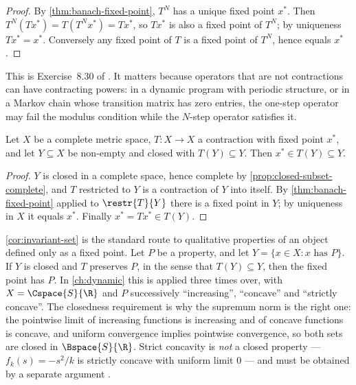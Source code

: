 \begin{proof}
	By \autoref{thm:banach-fixed-point}, $T^N$ has a unique fixed point $x^\ast$.
	Then $T^N(Tx^\ast)=T(T^Nx^\ast)=Tx^\ast$, so $Tx^\ast$ is also a fixed point of
	$T^N$; by uniqueness $Tx^\ast=x^\ast$. Conversely any fixed point of $T$ is a
	fixed point of $T^N$, hence equals $x^\ast$.
\end{proof}

This is Exercise~8.30 of \textcite[p.~290]{fukuda2026notes}. It matters because
operators that are not contractions can have contracting powers: in a dynamic
program with periodic structure, or in a Markov chain whose transition matrix has
zero entries, the one-step operator may fail the modulus condition while the
$N$-step operator satisfies it.

\begin{corollary}\label{cor:invariant-set}
	Let $X$ be a complete metric space, $T\colon X\to X$ a contraction with fixed
	point $x^\ast$, and let $Y\subseteq X$ be non-empty and closed with
	$T(Y)\subseteq Y$. Then $x^\ast\in T(Y)\subseteq Y$.
\end{corollary}

\begin{proof}
	$Y$ is closed in a complete space, hence complete by
	\autoref{prop:closed-subset-complete}, and $T$ restricted to $Y$ is a
	contraction of $Y$ into itself. By \autoref{thm:banach-fixed-point} applied to
	$\restr{T}{Y}$ there is a fixed point in $Y$; by uniqueness in $X$ it equals
	$x^\ast$. Finally $x^\ast=Tx^\ast\in T(Y)$.
\end{proof}

\begin{remark}\label{rem:property-P}
	\autoref{cor:invariant-set} is the standard route to qualitative properties of
	an object defined only as a fixed point. Let $P$ be a property, and let
	$Y=\{x\in X : x\text{ has }P\}$. If $Y$ is closed and $T$ preserves $P$, in the
	sense that $T(Y)\subseteq Y$, then the fixed point has $P$. In
	\autoref{ch:dynamic} this is applied three times over, with $X=\Cspace{S}{\R}$
	and $P$ successively ``increasing'', ``concave'' and ``strictly concave''. The
	closedness requirement is why the supremum norm is the right one:
	the pointwise limit of increasing functions is increasing and of concave
	functions is concave, and uniform convergence implies pointwise convergence, so
	both sets are closed in $\Bspace{S}{\R}$. Strict concavity is \emph{not} a
	closed property --- $f_k(s)=-s^2/k$ is strictly concave with uniform limit $0$
	--- and must be obtained by a separate argument
	\autocite[Remark 8.11, p.~290]{fukuda2026notes}.
\end{remark}


